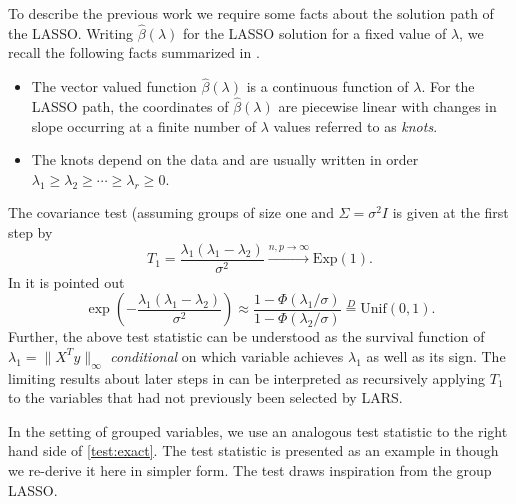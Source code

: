 \documentclass{imsart}
\begin{document}
To describe the previous work we require some facts about the solution path
of the LASSO.
Writing $\hat \beta(\lambda)$ for the LASSO solution for a fixed value of $\lambda$, we recall
the following facts summarized in \cite{significance:lasso,tibshirani_LASSO_uniqueness}.

\begin{itemize}

  \item The vector valued function $\hat \beta(\lambda)$ is a
    continuous function of $\lambda$. For the LASSO path, the
    coordinates of $\hat \beta(\lambda)$ are piecewise linear with
    changes in slope occurring at a finite number of $\lambda$ values
    referred to as \emph{knots}. 
    \item The knots depend on the data and are
    usually written in order $\lambda_1 \geq \lambda_2 \geq \cdots
    \geq \lambda_r \geq 0$. 

\end{itemize}

The covariance test (assuming groups of size one and $\Sigma = \sigma^2 I$ is given at the first step by
\begin{equation}
\label{eq:covtest}
T_1 = \frac{\lambda_1(\lambda_1-\lambda_2)}{\sigma^2} \overset{n,p \to \infty}{\to} \text{Exp}(1).
\end{equation}
In \cite{tests:adaptive} it is pointed out 
\begin{equation}
\label{test:exact}
\exp\left(- \frac{\lambda_1(\lambda_1-\lambda_2)}{\sigma^2} \right) \approx \frac{1 - \Phi(\lambda_1/\sigma)}{1 - \Phi(\lambda_2 / \sigma)} \overset{D}{=} \text{Unif}(0,1).
\end{equation}
Further, the above test statistic can be understood as the survival function of $\lambda_1 = \|X^Ty\|_{\infty}$
{\em conditional} on which variable achieves $\lambda_1$ as well as its sign.
The limiting results about later steps in \cite{significance:lasso} can
be interpreted as
recursively applying $T_1$ to the variables that had not previously been selected by LARS.

In the setting of grouped variables, we use an analogous test statistic to
the right hand side of \eqref{test:exact}. The test statistic is presented as an example
in \cite{tests:adaptive} though we re-derive it here in simpler form. The test draws inspiration
from the group LASSO.
\end{document}

